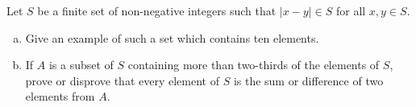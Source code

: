 Let $S$ be a finite set of non-negative integers such that $| x - y| \in S$
for all $x, y \in S$.

\begin{enumerate}[(a)]
\item Give an example of such a set which contains ten elements.
\item If $A$ is a subset of $S$ containing more than two-thirds of the elements of $S$,
prove or disprove that every element of $S$ is the sum or difference of two
elements from $A$.
\end{enumerate}
